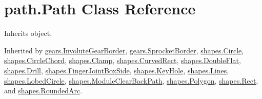 \hypertarget{classpath_1_1_path}{}\section{path.\+Path Class Reference}
\label{classpath_1_1_path}


Inherits object.



Inherited by \hyperlink{classgears_1_1_involute_gear_border}{gears.\+Involute\+Gear\+Border}, \hyperlink{classgears_1_1_sprocket_border}{gears.\+Sprocket\+Border}, \hyperlink{classshapes_1_1_circle}{shapes.\+Circle}, \hyperlink{classshapes_1_1_circle_chord}{shapes.\+Circle\+Chord}, \hyperlink{classshapes_1_1_clamp}{shapes.\+Clamp}, \hyperlink{classshapes_1_1_curved_rect}{shapes.\+Curved\+Rect}, \hyperlink{classshapes_1_1_double_flat}{shapes.\+Double\+Flat}, \hyperlink{classshapes_1_1_drill}{shapes.\+Drill}, \hyperlink{classshapes_1_1_finger_joint_box_side}{shapes.\+Finger\+Joint\+Box\+Side}, \hyperlink{classshapes_1_1_key_hole}{shapes.\+Key\+Hole}, \hyperlink{classshapes_1_1_lines}{shapes.\+Lines}, \hyperlink{classshapes_1_1_lobed_circle}{shapes.\+Lobed\+Circle}, \hyperlink{classshapes_1_1_module_clear_back_path}{shapes.\+Module\+Clear\+Back\+Path}, \hyperlink{classshapes_1_1_polygon}{shapes.\+Polygon}, \hyperlink{classshapes_1_1_rect}{shapes.\+Rect}, and \hyperlink{classshapes_1_1_rounded_arc}{shapes.\+Rounded\+Arc}.

